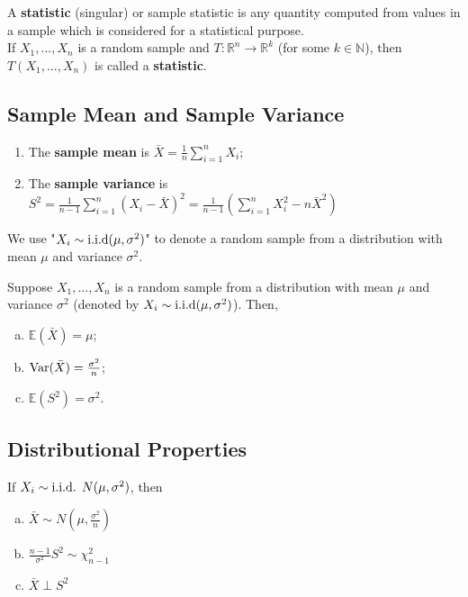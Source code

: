 \documentclass[11pt]{elegantbook}
\begin{document}
\begin{definition}[Statistic]
    \normalfont
    A \textbf{statistic} (singular) or sample statistic is any quantity computed from values in a sample which is considered for a statistical purpose.\\
    If $X_1,...,X_n$ is a random sample and $T: \mathbb{R}^n \rightarrow \mathbb{R}^k$ (for some $k\in \mathbb{N}$), then $T(X_1,...,X_n)$ is called a \textbf{statistic}.
\end{definition}

\subsection{Sample Mean and Sample Variance}
\begin{definition}
    \normalfont
    \begin{enumerate}
        \item The \textbf{sample mean} is $\bar{X}=\frac{1}{n}\sum_{i=1}^n X_i$;
        \item The \textbf{sample variance} is $S^2=\frac{1}{n-1}\sum_{i=1}^n (X_i-\bar{X})^2=\frac{1}{n-1}(\sum_{i=1}^n X_i^2 - n\bar{X}^2)$
    \end{enumerate}
\end{definition}

\begin{note}
    We use "$X_i\sim \textnormal{i.i.d}(\mu,\sigma^2)$" to denote a random sample from a distribution with mean $\mu$ and variance $\sigma^2$.
\end{note}

\begin{theorem}
    Suppose $X_1,...,X_n$ is a random sample from a distribution with mean $\mu$ and variance $\sigma^2$ (denoted by $X_i\sim \textnormal{i.i.d}(\mu,\sigma^2)$). Then,
    \begin{enumerate}[(a).]
        \item $\mathbb{E}(\bar{X})=\mu$;
        \item $\textnormal{Var}(\bar{X})=\frac{\sigma^2}{n}$;
        \item $\mathbb{E}(S^2)=\sigma^2$.
    \end{enumerate}
\end{theorem}


\subsection{Distributional Properties}
\begin{theorem}
    If $X_i\sim \textnormal{i.i.d. } N(\mu,\sigma^2)$, then
    \begin{enumerate}[(a).]
        \item $\bar{X}\sim N(\mu,\frac{\sigma^2}{n})$
        \item $\frac{n-1}{\sigma^2}S^2\sim \chi^2_{n-1}$
        \item $\bar{X}\perp S^2$
    \end{enumerate}
\end{theorem}
\end{document}
